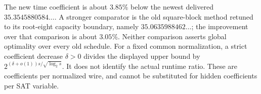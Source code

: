 The new time coefficient is about $3.85\%$ below the newest delivered
$35.3545880584\ldots$. A stronger comparator is the old square-block method
retuned to its root-eight capacity boundary, namely
$35.0635988462\ldots$; the improvement over that comparison is about $3.05\%$.
Neither comparison asserts global optimality over every old schedule. For a
fixed common normalization, a strict coefficient decrease $\delta>0$ divides
the displayed upper bound by $2^{(\delta+o(1))s/\sqrt{\log_2s}}$. It does not
identify the actual runtime ratio. These are coefficients per normalized
wire, and cannot be substituted for hidden coefficients per SAT variable.
